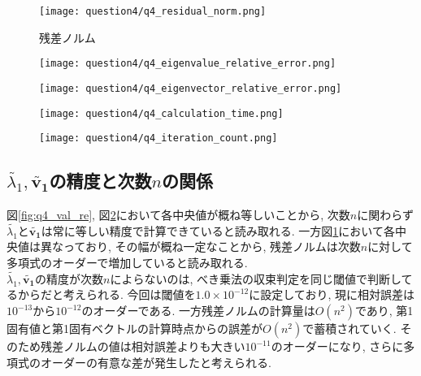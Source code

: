 \documentclass[uplatex,a4j]{jsarticle}
\begin{document}
\begin{figure}[ht]
  \centering
  \texttt{[image: question4/q4\_residual\_norm.png]}
  \caption{残差ノルム}
  \label{fig:q4_rn}
\end{figure}

\begin{figure}[htbp]
  \centering

  \begin{minipage}[t]{0.48\textwidth}
    \centering
    \texttt{[image: question4/q4\_eigenvalue\_relative\_error.png]}
    \label{fig:q4_val_re}
  \end{minipage}
  \hfill
  \begin{minipage}[t]{0.48\textwidth}
    \centering
    \texttt{[image: question4/q4\_eigenvector\_relative\_error.png]}
    \label{fig:q4_vec_re}
  \end{minipage}
  
\end{figure}

\begin{figure}[htbp]
  \centering

  \begin{minipage}[t]{0.48\textwidth}
    \centering
    \texttt{[image: question4/q4\_calculation\_time.png]}
    \label{fig:q4_ct}
  \end{minipage}
  \hfill
  \begin{minipage}[t]{0.48\textwidth}
    \centering
    \texttt{[image: question4/q4\_iteration\_count.png]}
    \label{fig:q4_ic}
  \end{minipage}
  
\end{figure}

\newpage
\subsection{$\tilde{\lambda_1}, \bm{\tilde{v_1}}$の精度と次数$n$の関係}
\label{sec:q4_2}
図\ref{fig:q4_val_re}, 図\ref{fig:q4_vec_re}において各中央値が概ね等しいことから, 
次数$n$に関わらず$\tilde{\lambda_1}$と$\bm{\tilde{v_1}}$は常に等しい精度で計算できていると読み取れる. 
一方図\ref{fig:q4_rn}において各中央値は異なっており, その幅が概ね一定なことから, 
残差ノルムは次数$n$に対して多項式のオーダーで増加していると読み取れる. \\
$\tilde{\lambda_1}, \bm{\tilde{v_1}}$の精度が次数$n$によらないのは, 
べき乗法の収束判定を同じ閾値で判断してるからだと考えられる. 
今回は閾値を$1.0 \times 10^{-12}$に設定しており, 現に相対誤差は$10^{-13}$から$10^{-12}$のオーダーである. 
一方残差ノルムの計算量は$O(n^2)$であり, 第1固有値と第1固有ベクトルの計算時点からの誤差が$O(n^2)$で蓄積されていく. 
そのため残差ノルムの値は相対誤差よりも大きい$10^{-11}$のオーダーになり, 
さらに多項式のオーダーの有意な差が発生したと考えられる. 
\end{document}

